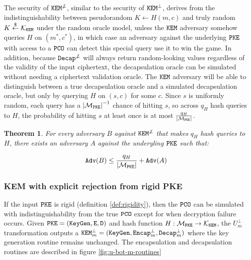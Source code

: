 \documentclass{article}
\newtheorem{theorem}{Theorem}[section]
\begin{document}
The security of $\texttt{KEM}^{\not\bot}$, similar to the security of $\texttt{KEM}^\bot$, derives from the indistinguishability between pseudorandom $K \leftarrow H(m, c)$ and truly random $K \stackrel{\$}{\leftarrow} \mathcal{K}_\texttt{KEM}$ under the random oracle model, unless the $\texttt{KEM}$ adversary somehow queries $H$ on $(m^\ast, c^\ast)$, in which case an adversary against the underlying $\texttt{PKE}$ with access to a $\texttt{PCO}$ can detect this special query use it to win the  game. In addition, because $\texttt{Decap}^{\not\bot}$ will always return random-looking values regardless of the validity of the input ciphertext, the decapsulation oracle can be simulated without needing a ciphertext validation oracle. The $\texttt{KEM}$ adversary will be able to distinguish between a true decapsulation oracle and a simulated decapsulation oracle, but only by querying $H$ on $(s, c)$ for some $c$. Since $s$ is uniformly random, each query has a $\left\lvert {\mathcal{M}_\texttt{PKE}} \right\rvert^{-1}$ chance of hitting $s$, so across $q_H$ hash queries to $H$, the probability of hitting $s$ at least once is at most $\frac{q_H}{\left\lvert {\mathcal{M}_\texttt{PKE}} \right\rvert}$.

\begin{theorem}
    For every  adversary $B$ against $\texttt{KEM}^{\not\bot}$ that makes $q_H$ hash queries to $H$, there exists an  adversary $A$ against the underyling $\texttt{PKE}$ such that:

    \begin{equation*}
        \texttt{Adv}(B) \leq \frac{q_H}{\left\lvert {\mathcal{M}_\texttt{PKE}} \right\rvert} + \texttt{Adv}(A)
    \end{equation*}
\end{theorem}

\subsubsection{KEM with explicit rejection from rigid PKE}
If the input $\texttt{PKE}$ is rigid (definition \ref{def:rigidity}), then the $\texttt{PCO}$ can be simulated with indistinguishability from the true $\texttt{PCO}$ except for when decryption failure occurs. Given $\texttt{PKE} = (\texttt{KeyGen}, \texttt{E}, \texttt{D})$ and hash function $H: \mathcal{M}_\texttt{PKE} \rightarrow \mathcal{K}_\texttt{KEM}$, the $U^\bot_m$ transformation outputs a $\texttt{KEM}^\bot_m = (\texttt{KeyGen}, \texttt{Encap}^\bot_m, \texttt{Decap}^\bot_m)$ where the key generation routine remains unchanged. The encapsulation and decapsulation routines are described in figure \ref{fig:u-bot-m-routines}
\end{document}
